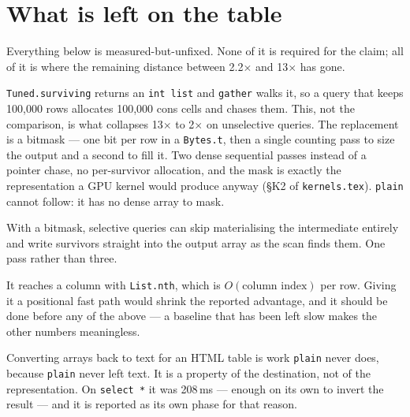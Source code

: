 \documentclass[11pt,a4paper]{article}
\newcommand{\squeeze}[1]{\textcolor{open}{\textbf{#1}}}
\begin{document}
\section{What is left on the table}
\label{sec:left}

Everything below is measured-but-unfixed. None of it is required for the claim; all of
it is where the remaining distance between 2.2$\times$ and 13$\times$ has gone.

\begin{description}[leftmargin=0pt, style=nextline]

\item[\squeeze{The survivor list is the bottleneck.}]
\texttt{Tuned.surviving} returns an \texttt{int list} and \texttt{gather} walks it, so a
query that keeps 100{,}000 rows allocates 100{,}000 cons cells and chases them. This,
not the comparison, is what collapses 13$\times$ to 2$\times$ on unselective queries.
The replacement is a bitmask --- one bit per row in a \texttt{Bytes.t}, then a single
counting pass to size the output and a second to fill it. Two dense sequential passes
instead of a pointer chase, no per-survivor allocation, and the mask is exactly the
representation a GPU kernel would produce anyway (\S K2 of \texttt{kernels.tex}).
\texttt{plain} cannot follow: it has no dense array to mask.

\item[\squeeze{Fuse the scan with the copy.}]
With a bitmask, selective queries can skip materialising the intermediate entirely and
write survivors straight into the output array as the scan finds them. One pass rather
than three.

\item[\squeeze{\texttt{plain} is carrying avoidable cost.}]
It reaches a column with \texttt{List.nth}, which is $O(\text{column index})$ per row.
Giving it a positional fast path would shrink the reported advantage, and it should be
done before any of the above --- a baseline that has been left slow makes the other
numbers meaningless.

\item[\squeeze{\texttt{render} is charged to \texttt{tuned} and should not be.}]
Converting arrays back to text for an HTML table is work \texttt{plain} never does,
because \texttt{plain} never left text. It is a property of the destination, not of the
representation. On \texttt{select *} it was 208\,ms --- enough on its own to invert the
result --- and it is reported as its own phase for that reason.


\end{description}
\end{document}
